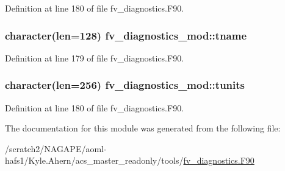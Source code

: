 Definition at line 180 of file fv\-\_\-diagnostics.\-F90.

\subsubsection[{tname}]{\setlength{\rightskip}{0pt plus 5cm}character(len=128) fv\-\_\-diagnostics\-\_\-mod\-::tname\hspace{0.3cm}{\ttfamily [private]}}\label{classfv__diagnostics__mod_af9092a94358dfd8005aebdb1df3977ed}


Definition at line 179 of file fv\-\_\-diagnostics.\-F90.

\subsubsection[{tunits}]{\setlength{\rightskip}{0pt plus 5cm}character(len=256) fv\-\_\-diagnostics\-\_\-mod\-::tunits\hspace{0.3cm}{\ttfamily [private]}}\label{classfv__diagnostics__mod_ae8b52ca6727586dd57e6d5315ca66dc0}


Definition at line 180 of file fv\-\_\-diagnostics.\-F90.



The documentation for this module was generated from the following file\-:\begin{DoxyCompactItemize}
\item 
/scratch2/\-N\-A\-G\-A\-P\-E/aoml-\/hafs1/\-Kyle.\-Ahern/acs\-\_\-master\-\_\-readonly/tools/\hyperlink{fv__diagnostics_8F90}{fv\-\_\-diagnostics.\-F90}\end{DoxyCompactItemize}
